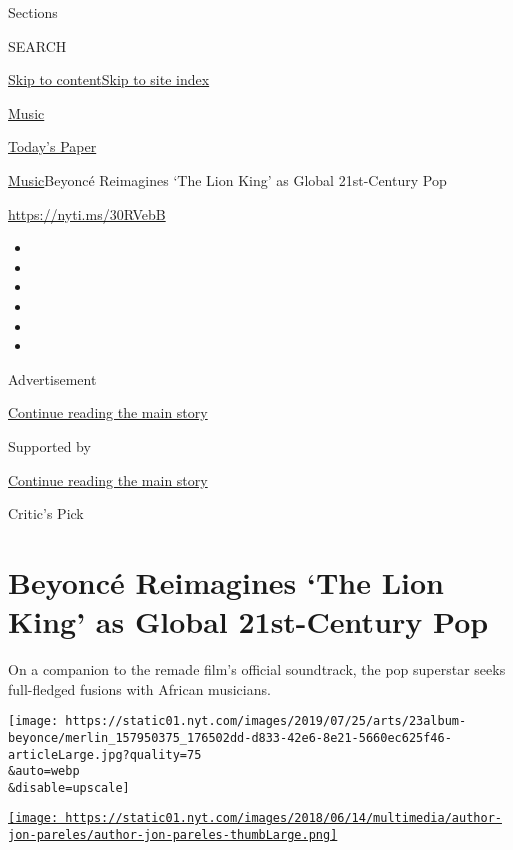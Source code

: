 Sections

SEARCH

\protect\hyperlink{site-content}{Skip to
content}\protect\hyperlink{site-index}{Skip to site index}

\href{https://www.nytimes.com/section/arts/music}{Music}

\href{https://myaccount.nytimes.com/auth/login?response_type=cookie\&client_id=vi}{}

\href{https://www.nytimes.com/section/todayspaper}{Today's Paper}

\href{/section/arts/music}{Music}\textbar{}Beyoncé Reimagines `The Lion
King' as Global 21st-Century Pop

\url{https://nyti.ms/30RVebB}

\begin{itemize}
\item
\item
\item
\item
\item
\item
\end{itemize}

Advertisement

\protect\hyperlink{after-top}{Continue reading the main story}

Supported by

\protect\hyperlink{after-sponsor}{Continue reading the main story}

Critic's Pick

\hypertarget{beyoncuxe9-reimagines-the-lion-king-as-global-21st-century-pop}{%
\section{Beyoncé Reimagines `The Lion King' as Global 21st-Century
Pop}\label{beyoncuxe9-reimagines-the-lion-king-as-global-21st-century-pop}}

On a companion to the remade film's official soundtrack, the pop
superstar seeks full-fledged fusions with African musicians.

\texttt{[image: https://static01.nyt.com/images/2019/07/25/arts/23album-beyonce/merlin\_157950375\_176502dd-d833-42e6-8e21-5660ec625f46-articleLarge.jpg?quality=75\\\&auto=webp\\\&disable=upscale]}

\href{https://www.nytimes.com/by/jon-pareles}{\texttt{[image: https://static01.nyt.com/images/2018/06/14/multimedia/author-jon-pareles/author-jon-pareles-thumbLarge.png]}}

